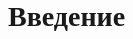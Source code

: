 \documentclass[pscyr,chapters]{hedwork}
\begin{document}
  \maketitle
  \onehalfspacing
  \tableofcontents

  \chapter*{Введение}

  \pagebreak

  \renewcommand{\bibname}{Список литературы}
  \begin{thebibliography}{9}
  \end{thebibliography}
\end{document}
